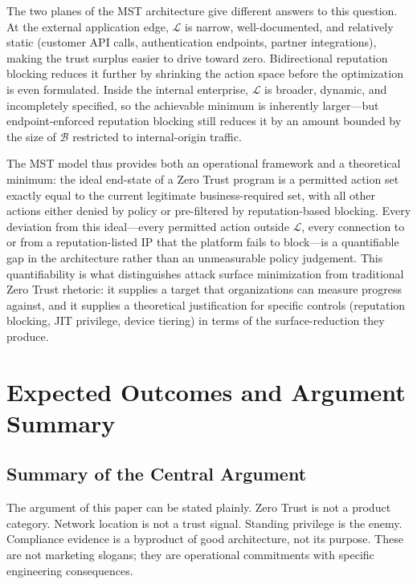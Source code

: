 \documentclass[acmlarge]{acmart}
\begin{document}
The two planes of the MST architecture give different answers to this question.
At the external application edge, $\mathcal{L}$ is narrow, well-documented, and
relatively static (customer API calls, authentication endpoints, partner integrations),
making the trust surplus easier to drive toward zero. Bidirectional reputation
blocking reduces it further by shrinking the action space before the optimization
is even formulated. Inside the internal enterprise, $\mathcal{L}$ is broader,
dynamic, and incompletely specified, so the achievable minimum is inherently
larger---but endpoint-enforced reputation blocking still reduces it by an amount
bounded by the size of $\mathcal{B}$ restricted to internal-origin traffic.

The MST model thus provides both an operational framework and a theoretical
minimum: the ideal end-state of a Zero Trust program is a permitted action set
exactly equal to the current legitimate business-required set, with all other
actions either denied by policy or pre-filtered by reputation-based blocking.
Every deviation from this ideal---every permitted action outside $\mathcal{L}$,
every connection to or from a reputation-listed IP that the platform fails to
block---is a quantifiable gap in the architecture rather than an unmeasurable
policy judgement. This quantifiability is what distinguishes attack surface
minimization from traditional Zero Trust rhetoric: it supplies a target that
organizations can measure progress against, and it supplies a theoretical
justification for specific controls (reputation blocking, JIT privilege,
device tiering) in terms of the surface-reduction they produce.

\section{Expected Outcomes and Argument Summary}
\label{sec:outcomes}

\subsection{Summary of the Central Argument}

The argument of this paper can be stated plainly. Zero Trust is not a product category.
Network location is not a trust signal. Standing privilege is the enemy. Compliance
evidence is a byproduct of good architecture, not its purpose. These are not marketing
slogans; they are operational commitments with specific engineering consequences.
\end{document}

